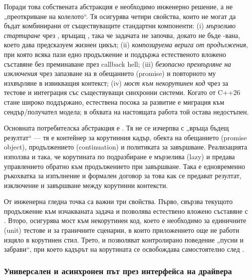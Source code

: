 Поради това собствената  абстракция е необходимо инженерно решение, а не „преоткриване на колелото“. Тя осигурява четири свойства, които не могат да бъдат комбинирани от съществуващите стандартни компоненти: (i) \emph{мързеливо стартиране} чрез , връщащ , така че задачата не започва, докато не бъде -вана, което дава предсказуем жизнен цикъл; (ii) \emph{композируема верига от продължения}, при която всяка  пази едно продължение и поддържа естественото вложено съставяне без преминаване през callback hell; (iii) \emph{безопасно прехвърляне на изключения} чрез запазване на  в обещанието (promise) и повторното му изхвърляне в извикващия контекст; (iv) \emph{мост към некорутинен код} чрез  за тестове и интеграция със съществуващи синхронни системи. Когато  от C++26 стане широко поддържано, естествена посока за развитие е миграция към сендър/получател модела; в обхвата на настоящата работа той остава недостъпен.

Основната потребителска абстракция е . Тя не се изчерпва с „връща бъдещ резултат“ --- тя е контейнер за корутинния кадър, обекта на обещанието (promise object), продължението (continuation) и политиката за завършване. Реализацията използва  и  така, че корутината по подразбиране е мързелива (lazy) и предава управлението обратно към продължението при завършване. Така  е едновременно ръкохватка за изпълнение и формален договор за това как се предават резултат, изключение и завършване между корутинни контексти.

От инженерна гледна точка са важни три свойства. Първо,  свързва текущото продължение към изчакваната задача и позволява естествено вложено съставяне с . Второ,  осигурява мост към некорутинен код, което е необходимо за единичните (unit) тестове и за граничните сценарии, в които приложението още не работи изцяло в корутинен стил. Трето,  и  позволяват контролирано поведение „пусни и забрави“, при което кадърът на корутината се освобождава самостоятелно след .

\subsubsection{Универсален и асинхронен път през интерфейса на драйвера}

